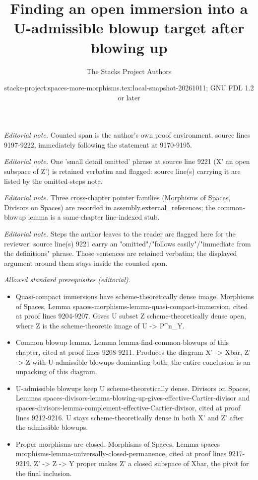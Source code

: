 \documentclass[10pt,a4paper]{amsart}
\title{Finding an open immersion into a U-admissible blowup target after blowing up}
\author{The Stacks Project Authors}
\date{stacks-project:spaces-more-morphisms.tex:local-snapshot-20261011; GNU FDL 1.2 or later}
\theoremstyle{plain}
\theoremstyle{definition}
\theoremstyle{remark}
\numberwithin{equation}{subsection}
\begin{document}
\maketitle
\noindent\textit{Editorial note.} Counted span is the author's own proof environment, source lines 9197-9222, immediately following the statement at 9170-9195.\par\medskip
\noindent\textit{Editorial note.} One 'small detail omitted' phrase at source line 9221 (X' an open subspace of Z') is retained verbatim and flagged: source line(s) carrying it are listed by the omitted-steps note.\par\medskip
\noindent\textit{Editorial note.} Three cross-chapter pointer families (Morphisms of Spaces, Divisors on Spaces) are recorded in assembly.external\_references; the common-blowup lemma is a same-chapter line-indexed stub.\par\medskip
\noindent\textit{Editorial note.} Steps the author leaves to the reader are flagged here for the reviewer: source line(s) 9221 carry an "omitted"/"follows easily"/"immediate from the definitions" phrase. Those sentences are retained verbatim; the displayed argument around them stays inside the counted span.\par\medskip
\noindent\textit{Allowed standard prerequisites (editorial).}\begin{itemize}
\item Quasi-compact immersions have scheme-theoretically dense image. Morphisms of Spaces, Lemma spaces-morphisms-lemma-quasi-compact-immersion, cited at proof lines 9204-9207. Gives U subset Z scheme-theoretically dense open, where Z is the scheme-theoretic image of U -> P\textasciicircum{}n\_Y.
\item Common blowup lemma. Lemma lemma-find-common-blowups of this chapter, cited at proof lines 9208-9211. Produces the diagram X' -> Xbar, Z' -> Z with U-admissible blowups dominating both; the entire conclusion is an unpacking of this diagram.
\item U-admissible blowups keep U scheme-theoretically dense. Divisors on Spaces, Lemmas spaces-divisors-lemma-blowing-up-gives-effective-Cartier-divisor and spaces-divisors-lemma-complement-effective-Cartier-divisor, cited at proof lines 9212-9216. U stays scheme-theoretically dense in both X' and Z' after the admissible blowups.
\item Proper morphisms are closed. Morphisms of Spaces, Lemma spaces-morphisms-lemma-universally-closed-permanence, cited at proof lines 9217-9219. Z' -> Z -> Y proper makes Z' a closed subspace of Xbar, the pivot for the final inclusion.
\end{itemize}\medskip
\end{document}
